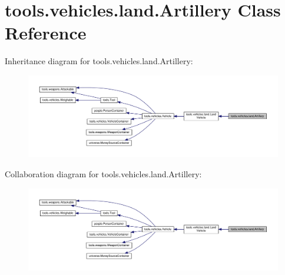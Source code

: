 \hypertarget{classtools_1_1vehicles_1_1land_1_1_artillery}{}\section{tools.\+vehicles.\+land.\+Artillery Class Reference}
\label{classtools_1_1vehicles_1_1land_1_1_artillery}


Inheritance diagram for tools.\+vehicles.\+land.\+Artillery\+:
\nopagebreak
\begin{figure}[H]
\begin{center}
\leavevmode
\includegraphics[width=350pt]{classtools_1_1vehicles_1_1land_1_1_artillery__inherit__graph}
\end{center}
\end{figure}


Collaboration diagram for tools.\+vehicles.\+land.\+Artillery\+:
\nopagebreak
\begin{figure}[H]
\begin{center}
\leavevmode
\includegraphics[width=350pt]{classtools_1_1vehicles_1_1land_1_1_artillery__coll__graph}
\end{center}
\end{figure}
